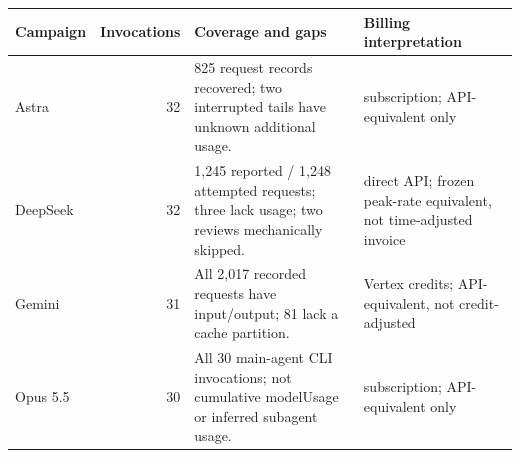 \begin{tabular}{lrll}
\toprule
Campaign & Invocations & Coverage and gaps & Billing interpretation \\
\midrule
Astra & 32 & 825 request records recovered; two interrupted tails have unknown additional usage. & subscription; API-equivalent only \\
DeepSeek & 32 & 1,245 reported / 1,248 attempted requests; three lack usage; two reviews mechanically skipped. & direct API; frozen peak-rate equivalent, not time-adjusted invoice \\
Gemini & 31 & All 2,017 recorded requests have input/output; 81 lack a cache partition. & Vertex credits; API-equivalent, not credit-adjusted \\
Opus 5.5 & 30 & All 30 main-agent CLI invocations; not cumulative modelUsage or inferred subagent usage. & subscription; API-equivalent only \\
\bottomrule
\end{tabular}
